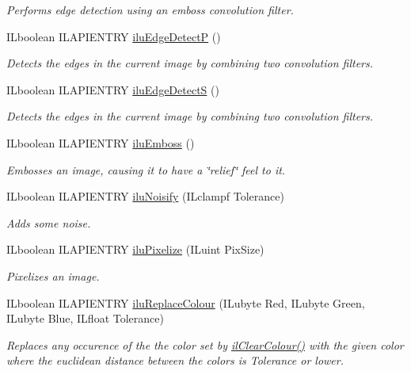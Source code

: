\begin{DoxyCompactItemize}
\begin{DoxyCompactList}\small\item\em Performs edge detection using an emboss convolution filter. \end{DoxyCompactList}\item 
I\-Lboolean I\-L\-A\-P\-I\-E\-N\-T\-R\-Y \hyperlink{group__ilu__filter_gac902e008927e48ce132306e344f5010d}{ilu\-Edge\-Detect\-P} ()
\begin{DoxyCompactList}\small\item\em Detects the edges in the current image by combining two convolution filters. \end{DoxyCompactList}\item 
I\-Lboolean I\-L\-A\-P\-I\-E\-N\-T\-R\-Y \hyperlink{group__ilu__filter_ga91f176b607f5357b748079e21a6bbc63}{ilu\-Edge\-Detect\-S} ()
\begin{DoxyCompactList}\small\item\em Detects the edges in the current image by combining two convolution filters. \end{DoxyCompactList}\item 
I\-Lboolean I\-L\-A\-P\-I\-E\-N\-T\-R\-Y \hyperlink{group__ilu__filter_gab94eba669177860af590c7bed1927c30}{ilu\-Emboss} ()
\begin{DoxyCompactList}\small\item\em Embosses an image, causing it to have a \char`\"{}relief\char`\"{} feel to it. \end{DoxyCompactList}\item 
I\-Lboolean I\-L\-A\-P\-I\-E\-N\-T\-R\-Y \hyperlink{group__ilu__filter_gac4c1596626e01c41075c7fdeda113642}{ilu\-Noisify} (I\-Lclampf Tolerance)
\begin{DoxyCompactList}\small\item\em Adds some noise. \end{DoxyCompactList}\item 
I\-Lboolean I\-L\-A\-P\-I\-E\-N\-T\-R\-Y \hyperlink{group__ilu__filter_ga609a51f490472174047feaf70918e3ac}{ilu\-Pixelize} (I\-Luint Pix\-Size)
\begin{DoxyCompactList}\small\item\em Pixelizes an image. \end{DoxyCompactList}\item 
I\-Lboolean I\-L\-A\-P\-I\-E\-N\-T\-R\-Y \hyperlink{group__ilu__filter_gac3447a57b322058f1c2e49faa724e4f0}{ilu\-Replace\-Colour} (I\-Lubyte Red, I\-Lubyte Green, I\-Lubyte Blue, I\-Lfloat Tolerance)
\begin{DoxyCompactList}\small\item\em Replaces any occurence of the the color set by \hyperlink{group__state_gaca1dc7f7b8e61eb134060c9c8a8b72f2}{il\-Clear\-Colour()} with the given color where the euclidean distance between the colors is {\itshape Tolerance} or lower. \end{DoxyCompactList}\item 

\end{DoxyCompactItemize}
